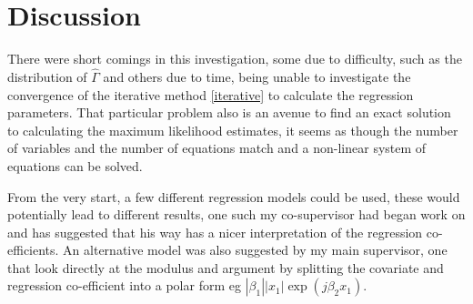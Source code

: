 \documentclass[honours,12pt]{unswthesis}
\numberwithin{equation}{section}
\begin{document}
\section{Discussion}

There were short comings in this investigation, some due to difficulty, such as the distribution of $\widehat{\Gamma}$ and others due to time, being unable to investigate the convergence of the iterative method \ref{iterative} to calculate the regression parameters. That particular problem also is an avenue to find an exact solution to calculating the maximum likelihood estimates, it seems as though the number of variables and the number of equations match and a non-linear system of equations can be solved. \par
From the very start, a few different regression models could be used, these would potentially lead to different results, one such my co-supervisor had began work on and has suggested that his way has a nicer interpretation of the regression co-efficients. An alternative model was also suggested by my main supervisor, one that look directly at the modulus and argument by splitting the covariate and regression co-efficient into a polar form eg $|\beta_{1}||x_{1}| \exp ( j  \beta_{2} x_{1})$.


\clearpage
{}

\end{document}
